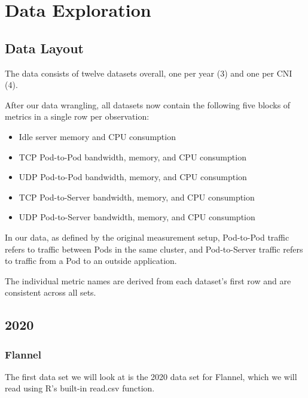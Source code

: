 %
%

\pagebreak
\section{Data Exploration}

\onehalfspacing

\subsection{Data Layout}

The data consists of twelve datasets overall, one per year (3) and one per CNI (4).

After our data wrangling, all datasets now contain the following five blocks of metrics in a single row per observation:

\begin{itemize}
    \item Idle server memory and CPU consumption
    \item TCP Pod-to-Pod bandwidth, memory, and CPU consumption
    \item UDP Pod-to-Pod bandwidth, memory, and CPU consumption
    \item TCP Pod-to-Server bandwidth, memory, and CPU consumption
    \item UDP Pod-to-Server bandwidth, memory, and CPU consumption
\end{itemize}

In our data, as defined by the original measurement setup, Pod-to-Pod traffic refers to traffic between Pods in the same cluster, and Pod-to-Server traffic refers to traffic from a Pod to an outside application.

The individual metric names are derived from each dataset's first row and are consistent across all sets.

\subsection{2020}

\subsubsection{Flannel}

The first data set we will look at is the 2020 data set for Flannel,
which we will read using R's built-in read.csv function.

\begin{Shaded}
\begin{Highlighting}[]
\OtherTok{\textless{}{-}} 
\OtherTok{\textless{}{-}} \NormalTok{(}\NormalTok{,}\NormalTok{))}
\end{Highlighting}
\end{Shaded}


